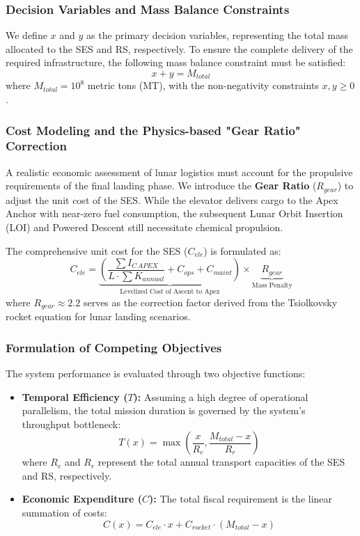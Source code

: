 \documentclass{mcmthesis}
\begin{document}
	\subsubsection{Decision Variables and Mass Balance Constraints}
	We define $x$ and $y$ as the primary decision variables, representing the total mass allocated to the SES and RS, respectively. To ensure the complete delivery of the required infrastructure, the following mass balance constraint must be satisfied:
	\begin{equation}
		x + y = M_{total}
	\end{equation}
	where $M_{total} = 10^8$ metric tons (MT), with the non-negativity constraints $x, y \geq 0$.
	
	\subsubsection{Cost Modeling and the Physics-based "Gear Ratio" Correction}
	A realistic economic assessment of lunar logistics must account for the propulsive requirements of the final landing phase. We introduce the \textbf{Gear Ratio} ($R_{gear}$) to adjust the unit cost of the SES. While the elevator delivers cargo to the Apex Anchor with near-zero fuel consumption, the subsequent Lunar Orbit Insertion (LOI) and Powered Descent still necessitate chemical propulsion. 
	
	The comprehensive unit cost for the SES ($C_{ele}$) is formulated as:
	\begin{equation}
		C_{ele} = \underbrace{\left( \frac{\sum I_{C\,APEX}}{L \cdot \sum K_{annual}} + C_{ops} + C_{maint} \right)}_{\text{Levelized Cost of Ascent to Apex}} \times \underbrace{R_{gear}}_{\text{Mass Penalty}}
	\end{equation}
	where $R_{gear} \approx 2.2$ serves as the correction factor derived from the Tsiolkovsky rocket equation for lunar landing scenarios.
	
	\subsubsection{Formulation of Competing Objectives}
	The system performance is evaluated through two objective functions:
	\begin{itemize}
		\item \textbf{Temporal Efficiency ($T$):} Assuming a high degree of operational parallelism, the total mission duration is governed by the system's throughput bottleneck:
		\begin{equation}
			T(x) = \max \left( \frac{x}{R_e}, \frac{M_{total} - x}{R_r} \right)
		\end{equation}
		where $R_e$ and $R_r$ represent the total annual transport capacities of the SES and RS, respectively.
		\item \textbf{Economic Expenditure ($C$):} The total fiscal requirement is the linear summation of costs:
		\begin{equation}
			C(x) = C_{ele} \cdot x + C_{rocket} \cdot (M_{total} - x)
		\end{equation}
	\end{itemize}
	
\end{document}
